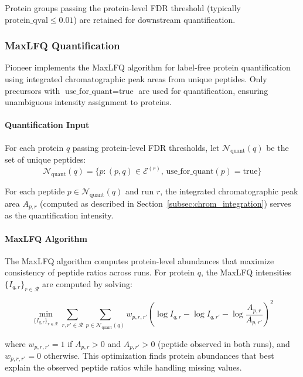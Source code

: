 \documentclass[pdflatex,sn-nature]{sn-jnl}
\begin{document}
Protein groups passing the protein-level FDR threshold (typically $\text{protein\_qval} \leq 0.01$) are retained for downstream quantification.

\subsubsection{MaxLFQ Quantification}

Pioneer implements the MaxLFQ algorithm \cite{Cox2014} for label-free protein quantification using integrated chromatographic peak areas from unique peptides. Only precursors with $\text{use\_for\_quant} = \text{true}$ are used for quantification, ensuring unambiguous intensity assignment to proteins.

\paragraph{Quantification Input} For each protein $q$ passing protein-level FDR thresholds, let $\mathcal{N}_{\text{quant}}(q)$ be the set of unique peptides:
\begin{equation}
\mathcal{N}_{\text{quant}}(q) = \{p : (p, q) \in \mathcal{E}^{(r)}, \, \text{use\_for\_quant}(p) = \text{true}\}
\end{equation}

For each peptide $p \in \mathcal{N}_{\text{quant}}(q)$ and run $r$, the integrated chromatographic peak area $A_{p,r}$ (computed as described in Section~\ref{subsec:chrom_integration}) serves as the quantification intensity.

\paragraph{MaxLFQ Algorithm} The MaxLFQ algorithm computes protein-level abundances that maximize consistency of peptide ratios across runs. For protein $q$, the MaxLFQ intensities $\{I_{q,r}\}_{r \in \mathcal{R}}$ are computed by solving:

\begin{equation}
\min_{\{I_{q,r}\}_{r \in \mathcal{R}}} \sum_{r,r' \in \mathcal{R}} \sum_{p \in \mathcal{N}_{\text{quant}}(q)} w_{p,r,r'} \left( \log I_{q,r} - \log I_{q,r'} - \log \frac{A_{p,r}}{A_{p,r'}} \right)^2
\end{equation}

where $w_{p,r,r'} = 1$ if $A_{p,r} > 0$ and $A_{p,r'} > 0$ (peptide observed in both runs), and $w_{p,r,r'} = 0$ otherwise. This optimization finds protein abundances that best explain the observed peptide ratios while handling missing values.
\end{document}
